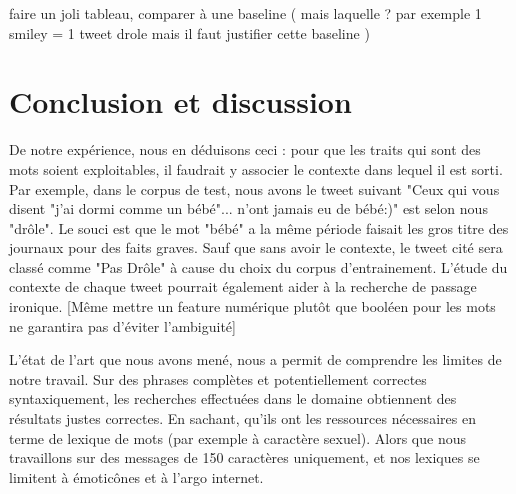 \documentclass[10pt,a4paper,twoside]{article}
\begin{document}
%

faire un joli tableau, comparer à une baseline ( mais laquelle ? par exemple  1 smiley = 1 tweet drole mais il faut justifier cette baseline ) 



\section{Conclusion et discussion}

De notre expérience, nous en déduisons ceci : pour que les traits qui sont des mots soient exploitables, il faudrait y associer le contexte dans lequel il est sorti. Par exemple, dans le corpus de test, nous avons le tweet suivant "Ceux qui vous disent "j'ai dormi comme un bébé"... n'ont jamais eu de bébé:)" est selon nous "drôle". Le souci est que le mot "bébé" a la même période faisait les gros titre des journaux pour des faits graves. Sauf que sans avoir le contexte, le tweet cité sera classé comme "Pas Drôle" à cause du choix du corpus d'entrainement. L'étude du contexte de chaque tweet pourrait également aider à la recherche de passage ironique. 
[Même mettre un feature numérique plutôt que booléen pour les mots ne garantira pas d'éviter l'ambiguité]

L'état de l'art que nous avons mené, nous a permit de comprendre les limites de notre travail. Sur des phrases complètes et potentiellement correctes syntaxiquement, les recherches effectuées dans le domaine obtiennent des résultats justes correctes. En sachant, qu'ils ont les ressources nécessaires en terme de lexique de mots (par exemple à caractère sexuel). Alors que nous travaillons sur des messages de 150 caractères uniquement, et nos lexiques se limitent à émoticônes et à l'argo internet. 




\nocite{Kiddon11,MihalceaP07}

\end{document}
